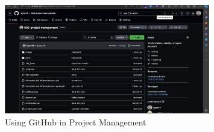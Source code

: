 \begin{figure}[ht]
    \centering
    \includegraphics[width=0.8\textwidth]{images/github.png}
    \caption{Using GitHub in Project Management}
    \label{fig:github}
\end{figure}


\FloatBarrier
\newpage